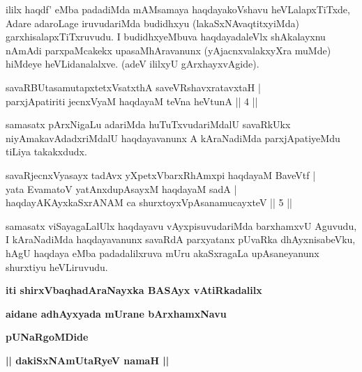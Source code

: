 \begin{artha}
ililx haqdf' eMba padadiMda mAMsamaya haqdayakoVshavu heVLalapxTiTxde, Adare adaroLage iruvudariMda budidhxyu (lakaSxNAvaqtitxyiMda) garxhisalapxTiTxruvudu. I budidhxyeMbuva haqdayadaleVlx shAkalayxnu nAmAdi parxpaMcakekx upasaMhAravanunx (yAjacnxvalakxyXra muMde) hiMdeye heVLidanalalxve. (adeV ililxyU gArxhayxvAgide).
\end{artha}


\begin{shl}
savaRBUtasamutapxtetxVsatxthA saveVRshavxratavxtaH | \\
parxjApatiriti jecnxVyaM haqdayaM teVna heVtunA \hfill ||  4 || 
\end{shl}

\begin{artha}
samasatx pArxNigaLu adariMda huTuTxvudariMdalU savaRkUkx niyAmakavAdadxriMdalU haqdayavanunx A kAraNadiMda parxjApatiyeMdu tiLiya takakxdudx.
\end{artha}


\begin{shl}
savaRjecnxVyasayx tadAvx	yXpetxVbarxRhAmxpi haqdayaM BaveVtf | \\
yata EvamatoV yatAnxdupAsayxM haqdayaM sadA  | \\
 haqdayAKAyxkaSxrANAM ca shurxtoyxVpAsanamucayxteV \hfill ||  5 ||
\end{shl}

\begin{artha}
samasatx viSayagaLalUlx haqdayavu vAyxpisuvudariMda barxhamxvU Aguvudu, I kAraNadiMda haqdayavanunx savaRdA parxyatanx pUvaRka dhAyxnisabeVku, hAgU haqdaya eMba padadalilxruva mUru akaSxragaLa upAsaneyanunx shurxtiyu heVLiruvudu.
\end{artha}

\begin{center}
{\bf iti shirxVbaqhadAraNayxka BASAyx vAtiRkadalilx}
\medskip

{\bf aidane adhAyxyada mUrane bArxhamxNavu}

\smallskip
{\bf pUNaRgoMDide}

\smallskip
{\bf || dakiSxNAmUtaRyeV namaH ||}
\end{center}

\bigskip

